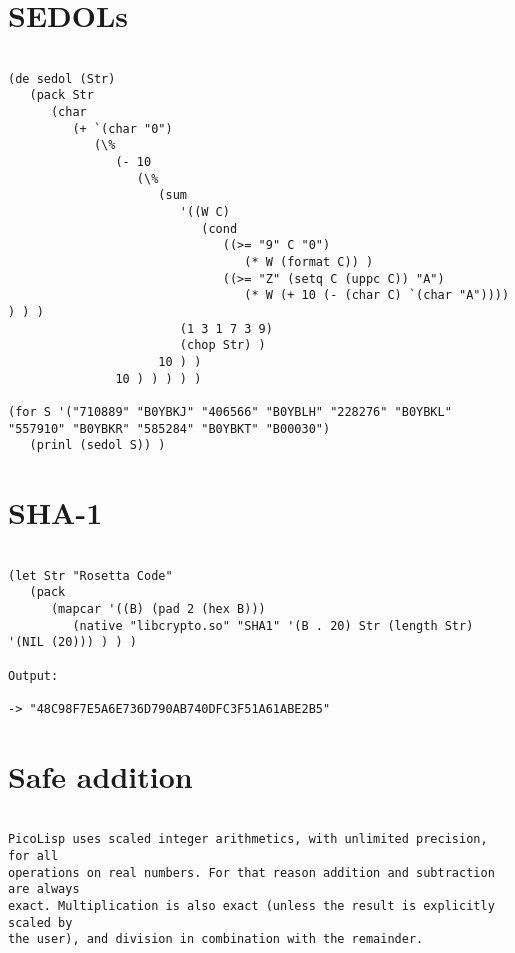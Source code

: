 \section*{SEDOLs}

\begin{verbatim}

(de sedol (Str)
   (pack Str
      (char
         (+ `(char "0")
            (\%
               (- 10
                  (\%
                     (sum
                        '((W C)
                           (cond
                              ((>= "9" C "0")
                                 (* W (format C)) )
                              ((>= "Z" (setq C (uppc C)) "A")
                                 (* W (+ 10 (- (char C) `(char "A")))) ) ) )
                        (1 3 1 7 3 9)
                        (chop Str) )
                     10 ) )
               10 ) ) ) ) )

(for S '("710889" "B0YBKJ" "406566" "B0YBLH" "228276" "B0YBKL" "557910" "B0YBKR" "585284" "B0YBKT" "B00030")
   (prinl (sedol S)) )

\end{verbatim}

\section*{SHA-1}

\begin{verbatim}

(let Str "Rosetta Code"
   (pack
      (mapcar '((B) (pad 2 (hex B)))
         (native "libcrypto.so" "SHA1" '(B . 20) Str (length Str) '(NIL (20))) ) ) )

Output:

-> "48C98F7E5A6E736D790AB740DFC3F51A61ABE2B5"

\end{verbatim}

\section*{Safe addition}

\begin{verbatim}

PicoLisp uses scaled integer arithmetics, with unlimited precision, for all
operations on real numbers. For that reason addition and subtraction are always
exact. Multiplication is also exact (unless the result is explicitly scaled by
the user), and division in combination with the remainder.

\end{verbatim}

